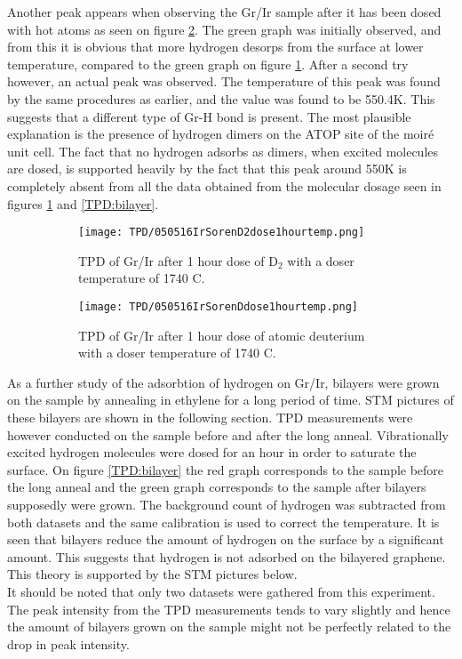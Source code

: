 Another peak appears when observing the Gr/Ir sample after it has been dosed with hot atoms as seen on figure \ref{TPD:D}. The green graph was initially observed, and from this it is obvious that more hydrogen desorps from the surface at lower temperature, compared to the green graph on figure \ref{TPD:D2}. After a second try however, an actual peak was observed. The temperature of this peak was found by the same procedures as earlier, and the value was found to be 550.4K. This suggests that a different type of Gr-H bond is present. The most plausible explanation is the presence of hydrogen dimers on the ATOP site of the moiré unit cell. The fact that no hydrogen adsorbs as dimers, when excited molecules are dosed, is supported heavily by the fact that this peak around 550K is completely absent from all the data obtained from the molecular dosage seen in figures \ref{TPD:D2} and \ref{TPD:bilayer}.

\begin{figure}
  \centering
  \begin{subfigure}[b]{0.45\textwidth}
    \texttt{[image: TPD/050516IrSorenD2dose1hourtemp.png]}
    \caption{TPD of Gr/Ir after 1 hour dose of D$_2$ with a doser temperature of 1740 \degree C.}
    \label{TPD:D2}
  \end{subfigure}\hspace{0.5cm}
  \begin{subfigure}[b]{0.45\textwidth}
    \texttt{[image: TPD/050516IrSorenDdose1hourtemp.png]}
    \caption{TPD of Gr/Ir after 1 hour dose of atomic deuterium with a doser temperature of 1740 \degree C.}
    \label{TPD:D}
  \end{subfigure}
  \caption{}
  \label{TPD:all}
\end{figure}

As a further study of the adsorbtion of hydrogen on Gr/Ir, bilayers were grown on the sample by annealing in ethylene for a long period of time. STM pictures of these bilayers are shown in the following section. TPD measurements were however conducted on the sample before and after the long anneal. Vibrationally excited hydrogen molecules were dosed for an hour in order to saturate the surface. On figure \ref{TPD:bilayer} the red graph corresponds to the sample before the long anneal and the green graph corresponds to the sample after bilayers supposedly were grown. The background count of hydrogen was subtracted from both datasets and the same calibration is used to correct the temperature. It is seen that bilayers reduce the amount of hydrogen on the surface by a significant amount. This suggests that hydrogen is not adsorbed on the bilayered graphene. This theory is supported by the STM pictures below.\\
It should be noted that only two datasets were gathered from this experiment. The peak intensity from the TPD measurements tends to vary slightly and hence the amount of bilayers grown on the sample might not be perfectly related to the drop in peak intensity.


